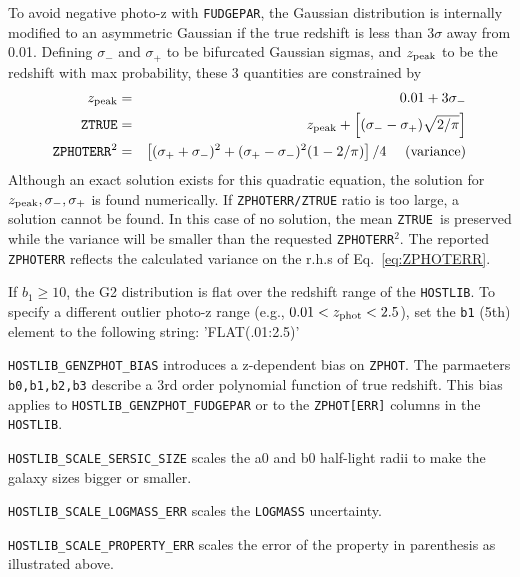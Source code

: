 \documentclass[12pt]{article}
\newcommand{\unc}{uncertainty}
\newcommand{\Zphot}{z_{\rm phot}}
\newcommand{\ztrue}{{\tt ZTRUE}}
\begin{document}
{%
\newcommand{\sigplus}{\sigma_{+}}
\newcommand{\sigminus}{\sigma_{-}}
\newcommand{\zpeak}{z_{\rm peak}}
To avoid negative photo-z with {\tt FUDGEPAR}, 
the Gaussian distribution is internally modified to an asymmetric
Gaussian if the true redshift is less than $3\sigma$ away from 0.01.
Defining $\sigminus$ and $\sigplus$ to be bifurcated Gaussian sigmas,
and $\zpeak$ to be the redshift with max probability,
these 3 quantities are constrained by
%
\begin{eqnarray}
  \zpeak      &  = & 0.01 + 3\sigminus \\
%
  {\tt ZTRUE} &  = & \zpeak + 
      \left[ (\sigminus - \sigplus)\sqrt{2/\pi}\right] \\
%
  {\tt ZPHOTERR}^2 & = & 
   \left[ (\sigplus+\sigminus)^2 + 
          (\sigplus-\sigminus)^2 (1-2/\pi) \right]/4  
    ~~~~{\rm (variance)} \label{eq:ZPHOTERR}
\end{eqnarray}
%
Although an exact solution exists for this quadratic equation,
the solution for $\zpeak,\sigminus,\sigplus$ is found numerically.
If {\tt ZPHOTERR/ZTRUE} ratio is too large, a solution cannot be found.
In this case of no solution, the mean \ztrue\ is preserved while 
the variance will be smaller than the requested {\tt ZPHOTERR}$^2$.
The reported {\tt ZPHOTERR} reflects the calculated variance on
the r.h.s of Eq.~\ref{eq:ZPHOTERR}.

If $b_1 \ge 10$, the G2 distribution is flat over
the redshift range of the {\tt HOSTLIB}. 
To specify a different outlier photo-z range (e.g., $0.01 < \Zphot < 2.5$), 
set the {\tt b1} (5th) 
element to the following string: 'FLAT(.01:2.5)'


{\tt HOSTLIB\_GENZPHOT\_BIAS} introduces a z-dependent bias on {\tt ZPHOT}.
The parmaeters {\tt b0,b1,b2,b3} describe a 3rd order polynomial function
of true redshift. This bias applies to {\tt HOSTLIB\_GENZPHOT\_FUDGEPAR} 
or to the {\tt ZPHOT[ERR]} columns in the {\tt HOSTLIB}.

{\tt HOSTLIB\_SCALE\_SERSIC\_SIZE} scales the a0 and b0 half-light radii
to make the galaxy sizes bigger or smaller.

{\tt HOSTLIB\_SCALE\_LOGMASS\_ERR} scales the {\tt LOGMASS} \unc.

{\tt HOSTLIB\_SCALE\_PROPERTY\_ERR} scales the error of the property in parenthesis as illustrated above.

}
\end{document}
